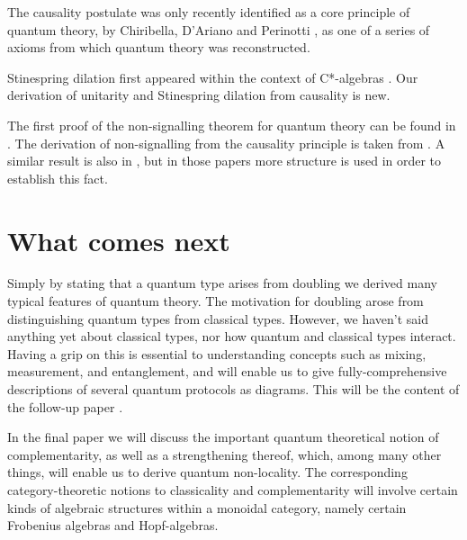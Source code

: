 \documentclass[12pt]{article}
\begin{document}
The causality postulate was only recently identified as a core principle of quantum theory, by Chiribella, D'Ariano and Perinotti \cite{chiri1}, as one of a series of axioms from which quantum theory was reconstructed.

Stinespring dilation first appeared within the context of C*-algebras \cite{Stinespring}. Our derivation of unitarity and Stinespring dilation from causality is new.  

The first proof of the non-signalling theorem for quantum theory can be found in \cite{Ghirardi}. The derivation of non-signalling from the causality principle  is taken from \cite{Cnonsig}. A similar result is also in \cite{FritzII}, but in those papers more structure is used in order to establish this fact.     

\section{What comes next}    

Simply by stating that a quantum type arises from doubling we derived many typical features of quantum theory.  The motivation for doubling arose from distinguishing quantum types from classical types.  However, we haven't said anything yet about classical types, nor how quantum and classical types interact. Having a grip on this is essential to understanding concepts such as mixing, measurement, and entanglement, and will enable us to give fully-comprehensive descriptions of several quantum protocols as diagrams.  This will be the content of the follow-up paper \cite{CQMII}.   

In the final paper \cite{CQMIII} we will discuss the important quantum theoretical notion of complementarity, as well as a strengthening thereof, which, among many other things, will enable us to derive quantum non-locality.  The corresponding category-theoretic  notions to classicality and complementarity  will involve certain  kinds of algebraic structures within a monoidal category, namely certain Frobenius algebras and Hopf-algebras.    


  
\end{document}
